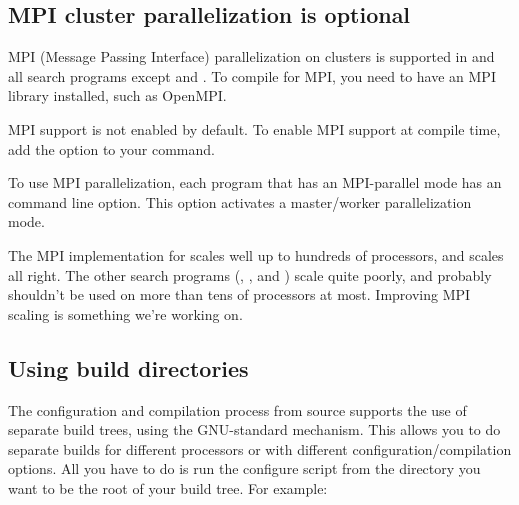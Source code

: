 \subsection{MPI cluster parallelization is optional}

MPI (Message Passing Interface) parallelization on clusters is
supported in  and all search programs except  and
. To compile for MPI, you need to have an MPI library
installed, such as OpenMPI.

MPI support is not enabled by default.  To enable MPI support at
compile time, add the  option to your
 command.

To use MPI parallelization, each program that has an MPI-parallel mode
has an  command line option. This option activates a
master/worker parallelization mode.

The MPI implementation for  scales well up to hundreds
of processors, and  scales all right. The other search
programs (, , and ) scale
quite poorly, and probably shouldn't be used on more than tens of
processors at most. Improving MPI scaling is something we're working on.


\subsection{Using build directories}

The configuration and compilation process from source supports the use
of separate build trees, using the GNU-standard 
mechanism. This allows you to do separate builds for different
processors or with different configuration/compilation options. All
you have to do is run the configure script from the directory you want
to be the root of your build tree.  For example:

  \vspace{1ex}
  \\
  \\
  \\
  \vspace{1ex}

